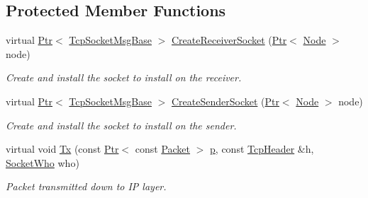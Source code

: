 \subsection*{Protected Member Functions}
\begin{DoxyCompactItemize}
\item 
virtual \hyperlink{classns3_1_1Ptr}{Ptr}$<$ \hyperlink{classns3_1_1TcpSocketMsgBase}{Tcp\+Socket\+Msg\+Base} $>$ \hyperlink{classWScalingTestCase_a45cb1ef68ab73dc766fb5ec6def3524f}{Create\+Receiver\+Socket} (\hyperlink{classns3_1_1Ptr}{Ptr}$<$ \hyperlink{classns3_1_1Node}{Node} $>$ node)
\begin{DoxyCompactList}\small\item\em Create and install the socket to install on the receiver. \end{DoxyCompactList}\item 
virtual \hyperlink{classns3_1_1Ptr}{Ptr}$<$ \hyperlink{classns3_1_1TcpSocketMsgBase}{Tcp\+Socket\+Msg\+Base} $>$ \hyperlink{classWScalingTestCase_a1b29911344276ed50597df32b2e8569d}{Create\+Sender\+Socket} (\hyperlink{classns3_1_1Ptr}{Ptr}$<$ \hyperlink{classns3_1_1Node}{Node} $>$ node)
\begin{DoxyCompactList}\small\item\em Create and install the socket to install on the sender. \end{DoxyCompactList}\item 
virtual void \hyperlink{classWScalingTestCase_a9246c9308c1ea06ada919f0981290f11}{Tx} (const \hyperlink{classns3_1_1Ptr}{Ptr}$<$ const \hyperlink{classns3_1_1Packet}{Packet} $>$ \hyperlink{lte__link__budget__x2__handover__measures_8m_ac9de518908a968428863f829398a4e62}{p}, const \hyperlink{classns3_1_1TcpHeader}{Tcp\+Header} \&h, \hyperlink{classns3_1_1TcpGeneralTest_a29338e6b7137cad650c2ff835713f6ee}{Socket\+Who} who)
\begin{DoxyCompactList}\small\item\em Packet transmitted down to IP layer. \end{DoxyCompactList}\end{DoxyCompactItemize}
